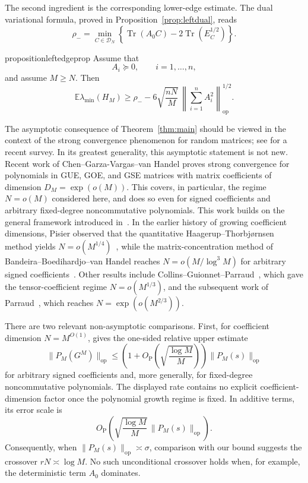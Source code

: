 \documentclass{article}
\newcommand{\E}{\mathbb E}
\newcommand{\DN}{\mathcal D_N}
\newcommand{\op}{\mathrm{op}}
\newcommand{\Arow}{\left\|\sum_{i=1}^n A_i^2\right\|_{\op}^{1/2}}
\DeclareMathOperator{\Tr}{Tr}
\begin{document}
The second ingredient is the corresponding lower-edge estimate.  The dual
variational formula, proved in Proposition~\ref{prop:leftdual}, reads
\[
	\rho_-=
	\min_{C\in\DN}
	\left\{
	\Tr(A_0C)-2\Tr(E_C^{1/2})
	\right\}.
\]

\begin{restatable*}{proposition}{leftedgeprop}
	\label{prop:leftedge}
	Assume that
	\[
		A_i\succeq0,\qquad i=1,\ldots,n,
	\]
	and assume $M\ge N$.  Then
	\[
		\E\lambda_{\min}(H_M)
		\ge
		\rho_-
		-
		6\sqrt{\frac{nN}{M}}\,\Arow.
	\]
\end{restatable*}



The asymptotic consequence of Theorem~\ref{thm:main} should be viewed in the
context of the strong convergence phenomenon for random matrices; see
\cite{vanHandelSurvey2025} for a recent survey.  In its greatest generality, this
asymptotic statement is not new.  Recent work of Chen--Garza-Vargas--van Handel
\cite[Theorem~1.1 and Corollary~1.2]{CGVvHClassical} proves strong convergence
for polynomials in GUE, GOE, and GSE matrices with matrix coefficients of
dimension $D_M=\exp(o(M))$.  This covers, in particular, the regime $N=o(M)$
considered here, and does so even for signed coefficients and arbitrary
fixed-degree noncommutative polynomials.  This work builds on the general
framework introduced in~\cite{CGVTvHClassicalI}.  In the earlier history of
growing coefficient dimensions, Pisier observed that the quantitative
Haagerup--Thorbj\o rnsen method yields
\(N=o(M^{1/4})\)~\cite[(0.9)]{PisierSubexponentialOperatorSpaces}, while the
matrix-concentration method of Bandeira--Boedihardjo--van Handel reaches
\(N=o(M/\log^3M)\) for arbitrary signed
coefficients~\cite[Theorem~2.10]{BBvH2023}.  Other results include
Collins--Guionnet--Parraud~\cite{CollinsParraudGuionnet}, which gave the
tensor-coefficient regime $N=o(M^{1/3})$, and the subsequent work of
Parraud~\cite{ParraudTensor2024}, which reaches $N=\exp(o(M^{2/3}))$.

There are two relevant non-asymptotic comparisons.  First, for coefficient
dimension \(N=M^{O(1)}\), \cite[Corollary~1.4]{CGVvHClassical} gives the
one-sided relative upper estimate
\[
	\|P_M(G^M)\|_{\op}
	\le
	\left(
		1+O_{\mathrm P}\!\left(\sqrt{\frac{\log M}{M}}\right)
	\right)
	\|P_M(s)\|_{\op}
\]
for arbitrary signed coefficients and, more generally, for fixed-degree
noncommutative polynomials.  The displayed rate contains no explicit
coefficient-dimension factor once the polynomial growth regime is fixed.  In
additive terms, its error scale is
\[
	O_{\mathrm P}\!\left(
	\sqrt{\frac{\log M}{M}}\,\|P_M(s)\|_{\op}
	\right).
\]
Consequently, when \(\|P_M(s)\|_{\op}\asymp\sigma\), comparison with our bound
suggests the crossover \(rN\asymp\log M\).  No such unconditional crossover
holds when, for example, the deterministic term \(A_0\) dominates.
\end{document}
